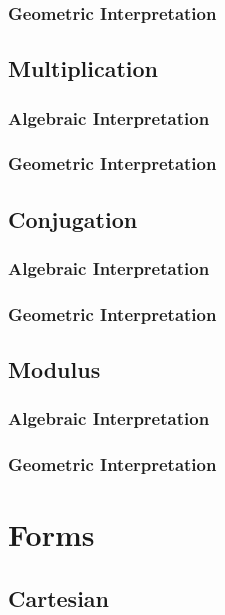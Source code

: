 \documentclass[10pt]{article}
\begin{document}
\subsubsection*{Geometric Interpretation}

\subsection*{Multiplication}
\label{subsec:mult}
\subsubsection*{Algebraic Interpretation}

\subsubsection*{Geometric Interpretation}

\subsection*{Conjugation}
\label{subsec:conj}
\subsubsection*{Algebraic Interpretation}

\subsubsection*{Geometric Interpretation}

\subsection*{Modulus}
\label{subsec:mod}
\subsubsection*{Algebraic Interpretation}

\subsubsection*{Geometric Interpretation}


\section*{Forms}
\label{sec:forms}

\subsection*{Cartesian}
\label{subsec:cart}
\end{document}
